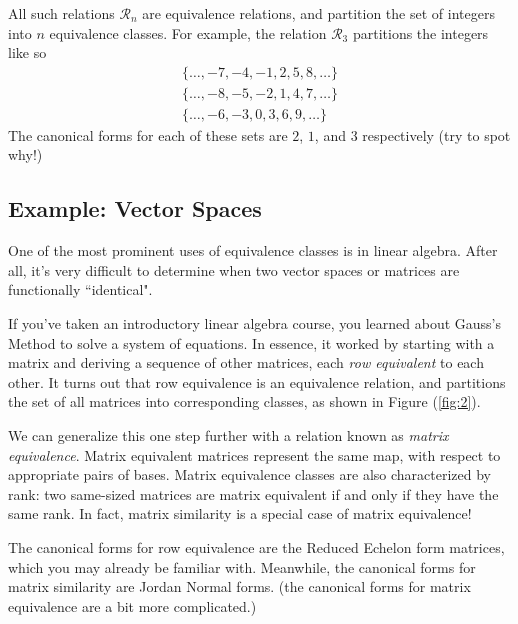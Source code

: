 \documentclass{article}
\begin{document}
        \vspace{2mm}
        All such relations $\mathcal{R}_{n}$ are equivalence relations, and partition the set of integers into $n$ equivalence classes. For example, the relation $\mathcal{R}_{3}$ partitions the integers like so
        \begin{gather*}
            \{\dots, -7, -4, -1, 2, 5, 8, \dots\} \\
            \{\dots, -8, -5, -2, 1, 4, 7, \dots\} \\
            \{\dots, -6, -3, 0, 3, 6, 9, \dots\}
        \end{gather*}
        The canonical forms for each of these sets are $2$, $1$, and $3$ respectively (try to spot why!)


    \subsection*{Example: Vector Spaces}
        One of the most prominent uses of equivalence classes is in linear algebra. After all, it's very difficult to determine when two vector spaces or matrices are functionally ``identical". 

        \vspace{3mm}
        If you've taken an introductory linear algebra course, you learned about Gauss's Method to solve a system of equations. In essence, it worked by starting with a matrix and deriving a sequence of other matrices, each \textit{row equivalent} to each other. It turns out that row equivalence is an equivalence relation, and partitions the set of all matrices into corresponding classes, as shown in Figure (\ref{fig:2}).

        \vspace{3mm}
        We can generalize this one step further with a relation known as \textit{matrix equivalence}. Matrix equivalent matrices represent the same map, with respect to appropriate pairs of bases. Matrix equivalence classes are also characterized by rank: two same-sized matrices are matrix equivalent if and only if they have the same rank. In fact, matrix similarity is a special case of matrix equivalence!

        \vspace{3mm}
         The canonical forms for row equivalence are the Reduced Echelon form matrices, which you may already be familiar with. Meanwhile, the canonical forms for matrix similarity are Jordan Normal forms. (the canonical forms for matrix equivalence are a bit more complicated.)
        
\end{document}
